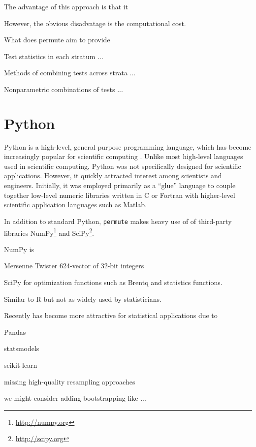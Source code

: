 The advantage of this approach is that it 

However, the obvious disadvatage is the computational cost.

What does permute aim to provide

Test statistics in each stratum ...

Methods of combining tests across strata ...

Nonparametric combinations of tests ...


\section{Python}

Python is a high-level, general purpose programming language, which has
become increasingly popular for scientific computing
\cite{millman2011python, Perez2011}. Unlike most high-level languages
used in scientific computing, Python was not specifically designed for
scientific applications.  However, it quickly attracted interest among
scientists and engineers.  Initially, it was employed primarily as a ``glue''
language to couple together low-level numeric libraries written in C or
Fortran with higher-level scientific application languages such as Matlab.

In addition to standard Python, \texttt{permute} makes heavy use of
of third-party libraries NumPy\footnote{\url{http://numpy.org}} and
SciPy\footnote{\url{http://scipy.org}}.

NumPy is

Mersenne Twister
624-vector of 32-bit integers

SciPy
for optimization functions such as Brentq and statistics functions.

Similar to R but not as widely used by statisticians.

Recently has become more attractive for statistical applications due to

Pandas

statsmodels

scikit-learn

missing high-quality resampling approaches

we might consider adding bootstrapping like ...
